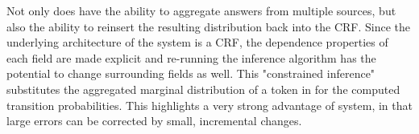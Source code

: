 Not only does \sysName have the ability to aggregate answers from multiple sources, but also the ability to reinsert the resulting distribution back into the CRF. Since the underlying architecture of the system is a CRF, the dependence properties of each field are made explicit and re-running the inference algorithm has the potential to change surrounding fields as well.  This "constrained inference" substitutes the aggregated marginal distribution of a token in for the computed transition probabilities.  This highlights a very strong advantage of \sysName system, in that large errors can be corrected by small, incremental changes.

